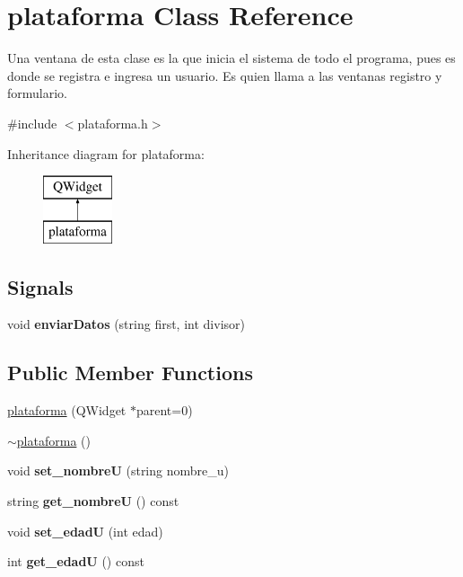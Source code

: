 \hypertarget{classplataforma}{}\section{plataforma Class Reference}
\label{classplataforma}


Una ventana de esta clase es la que inicia el sistema de todo el programa, pues es donde se registra e ingresa un usuario. Es quien llama a las ventanas registro y formulario.  




{\ttfamily \#include $<$plataforma.\+h$>$}

Inheritance diagram for plataforma\+:\begin{figure}[H]
\begin{center}
\leavevmode
\includegraphics[height=2.000000cm]{classplataforma}
\end{center}
\end{figure}
\subsection*{Signals}
\begin{DoxyCompactItemize}
\item 
\mbox{\label{classplataforma_a7059858bf747f452aff90d1486bad552}} 
void {\bfseries enviar\+Datos} (string first, int divisor)
\end{DoxyCompactItemize}
\subsection*{Public Member Functions}
\begin{DoxyCompactItemize}
\item 
\hyperlink{classplataforma_a200eafd497e5192ed3c535ad9653d824}{plataforma} (Q\+Widget $\ast$parent=0)
\item 
\hyperlink{classplataforma_a8c90e738adb0469626698000d7760c85}{$\sim$plataforma} ()
\item 
\mbox{\label{classplataforma_a59714e2d864f14e52c8d79643c9909da}} 
void {\bfseries set\+\_\+nombreU} (string nombre\+\_\+u)
\item 
\mbox{\label{classplataforma_a8bb7f8ccc1cceedbaab2b8b1670ead63}} 
string {\bfseries get\+\_\+nombreU} () const
\item 
\mbox{\label{classplataforma_a409b831a0f70bd38137f37519de3835a}} 
void {\bfseries set\+\_\+edadU} (int edad)
\item 
\mbox{\label{classplataforma_a669292aaf311df5ac54d948c9985eed8}} 
int {\bfseries get\+\_\+edadU} () const
\end{DoxyCompactItemize}


